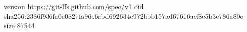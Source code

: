 version https://git-lfs.github.com/spec/v1
oid sha256:2386f936fa0e0827fa96e6abd692634e972bbb157ad67616aef8e5b3c786a80e
size 87544
